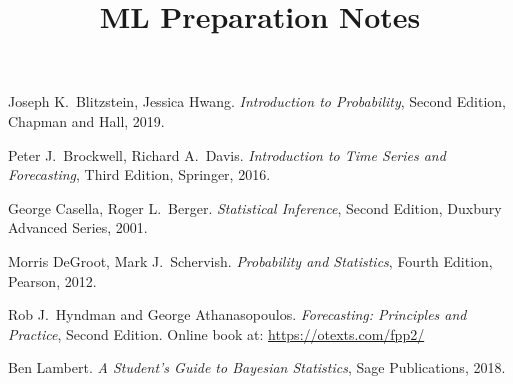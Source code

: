 \documentclass[11pt,a4]{report}
\title{ML Preparation Notes}
\theoremstyle{definition}
\begin{document}
\maketitle





\begin{thebibliography}{99}
  Joseph K.~Blitzstein, Jessica Hwang. \emph{Introduction 
to Probability}, Second Edition, Chapman and Hall, 2019.

 Peter J.~Brockwell, Richard A.~Davis. 
\emph{Introduction to Time Series and Forecasting}, Third Edition, Springer, 
2016. 

 George Casella, Roger L.~Berger. \emph{Statistical Inference}, 
Second Edition, Duxbury Advanced Series, 2001.

 Morris DeGroot, Mark J.~Schervish. \emph{Probability and 
Statistics}, Fourth Edition, Pearson, 2012.
  
 Rob J.~Hyndman and George Athanasopoulos. \emph{Forecasting: 
Principles and Practice}, Second Edition. Online book at: 
\url{https://otexts.com/fpp2/}

 Ben Lambert. \emph{A Student's Guide to Bayesian Statistics}, 
Sage Publications, 2018. 

\end{thebibliography}
\end{document}
